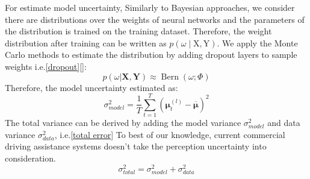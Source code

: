 For estimate model uncertainty, Similarly to Bayesian approaches, we consider there are distributions over the weights of neural networks and the parameters of the distribution is trained on the training dataset. Therefore, the weight distribution after training can be written as $p(\omega \mid \mathrm{X}, \mathrm{Y})$. We apply the Monte Carlo methods to estimate the distribution by adding dropout layers to sample weights i.e.\eqref{dropout}[]:
\begin{equation}
p(\omega | \mathbf{X}, \mathbf{Y}) \approx \operatorname{Bern}(\omega ; \Phi)\label{dropout}
\end{equation}
Therefore, the model uncertainty estimated as:
\begin{equation}
\sigma_{model}^{2} = \frac{1}{T} \sum_{t=1}^{T} \left(\boldsymbol{\mu}_{t}^{(l)}-\overline{\boldsymbol{\mu}}\right)^{2}\label{monte carlo}
\end{equation}
The total variance can be derived by adding the model variance $\sigma_{model}^{2}$ and data variance $\sigma_{data}^{2}$, i.e.\eqref{total error}
To best of our knowledge, current commercial driving assistance systems doesn't take the perception uncertainty into consideration. 
\begin{equation}
\sigma_{total}^{2} = \sigma_{model}^{2}+\sigma_{data}^{2}\label{total error}
\end{equation}


